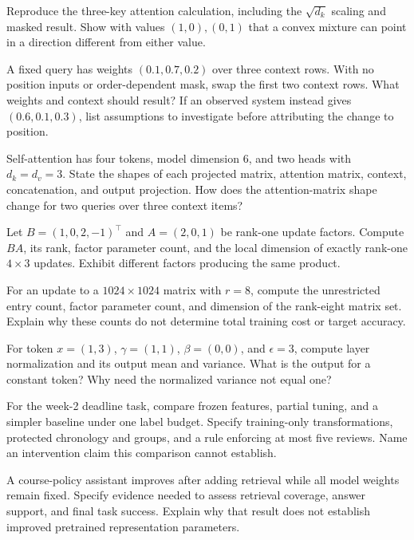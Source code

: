 \begin{exercises}
\item {}Reproduce the three-key attention calculation, including the $\sqrt{d_k}$ scaling and masked result. Show with values $(1,0),(0,1)$ that a convex mixture can point in a direction different from either value.
\item {}A fixed query has weights $(0.1,0.7,0.2)$ over three context rows. With no position inputs or order-dependent mask, swap the first two context rows. What weights and context should result? If an observed system instead gives $(0.6,0.1,0.3)$, list assumptions to investigate before attributing the change to position.
\item {}Self-attention has four tokens, model dimension $6$, and two heads with $d_k=d_v=3$. State the shapes of each projected matrix, attention matrix, context, concatenation, and output projection. How does the attention-matrix shape change for two queries over three context items?
\item {}Let $B=(1,0,2,-1)^\top$ and $A=(2,0,1)$ be rank-one update factors. Compute $BA$, its rank, factor parameter count, and the local dimension of exactly rank-one $4\times3$ updates. Exhibit different factors producing the same product.
\item {}For an update to a $1024\times1024$ matrix with $r=8$, compute the unrestricted entry count, factor parameter count, and dimension of the rank-eight matrix set. Explain why these counts do not determine total training cost or target accuracy.
\item {}For token $x=(1,3)$, $\gamma=(1,1)$, $\beta=(0,0)$, and $\epsilon=3$, compute layer normalization and its output mean and variance. What is the output for a constant token? Why need the normalized variance not equal one?
\item {}For the week-2 deadline task, compare frozen features, partial tuning, and a simpler baseline under one label budget. Specify training-only transformations, protected chronology and groups, and a rule enforcing at most five reviews. Name an intervention claim this comparison cannot establish.
\item \begin{minipage}[t]{\linewidth}A course-policy assistant improves after adding retrieval while all model weights remain fixed. Specify evidence needed to assess retrieval coverage, answer support, and final task success. Explain why that result does not establish improved pretrained representation parameters.\end{minipage}
\end{exercises}

